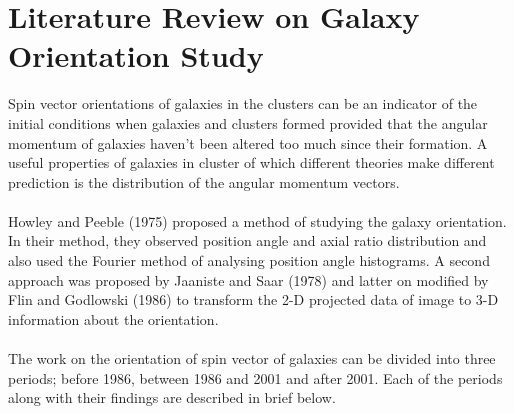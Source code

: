 \section{Literature Review on Galaxy Orientation Study}
Spin vector orientations of galaxies in the clusters can be an indicator of the initial conditions when galaxies and clusters formed provided that the angular momentum of galaxies haven't been altered too much since their formation. A useful properties of galaxies in cluster of which different theories make different prediction is the distribution of the angular momentum vectors.\\\\
Howley and Peeble (1975) proposed a method of studying the galaxy orientation. In their method, they observed position angle  and axial ratio distribution and also used the Fourier method of analysing position angle histograms. A second approach was proposed by Jaaniste and Saar (1978) and latter on modified by Flin and Godlowski (1986) to transform the 2-D projected data of image to 3-D information about the orientation.\\\\
The work on the orientation of spin vector of galaxies can be divided into three periods; before 1986, between 1986 and 2001 and after 2001. Each of the periods along with their findings are described in brief below.\\\\
